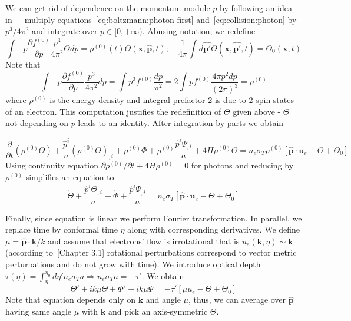 \documentclass[12pt]{extarticle}
\numberwithin{problem}{section}
\numberwithin{theorem}{section}
\begin{document}
	We can get rid of dependence on the momentum module $p$ by following an idea in~\cite{ma:1995} - multiply equations~\ref{eq:boltzmann:photon-first} and~\ref{eq:collision:photon} by $p^3/4\pi^2$ and integrate over $p\in[0,+\infty)$. Abusing notation, we redefine 
	\begin{equation}
		\label{eq:redef:theta}
		\int -p\frac{\partial f^{(0)}}{\partial p}\frac{p^3}{4\pi^2}\Theta dp = \rho^{(0)}(t)\Theta(\mathbf{x},\mathbf{\hat{p}}, t);\quad \frac{1}{4\pi}\int d\mathbf{\hat{p'}}\Theta(\mathbf{x}, \mathbf{\hat{p'}}, t) = \Theta_0(\mathbf{x}, t)
	\end{equation}
	Note that
	\begin{equation}
		\int -p\frac{\partial f^{(0)}}{\partial p}\frac{p^3}{4\pi^2} dp = \int p^3 f^{(0)} \frac{dp}{\pi^2} = 2\int pf^{(0)} \frac{4\pi p^2 dp}{(2\pi)^3} = \rho^{(0)}
	\end{equation}
	where $\rho^{(0)}$ is the energy density and integral prefactor 2 is due to 2 spin states of an electron. This computation justifies the redefinition of $\Theta$ given above - $\Theta$ not depending on $p$ leads to an identity. After integration by parts we obtain
	
	\begin{equation}
		\frac{\partial}{\partial t}(\rho^{(0)}\Theta) + \frac{\hat{p}^i}{a}(\rho^{(0)}\Theta)_{,i} + \rho^{(0)}\dot{\Phi} + \rho^{(0)}\frac{\hat{p}^i\Psi_{,i}}{a} + 4H\rho^{(0)}\Theta = n_e\sigma_T\rho^{(0)}[\mathbf{\hat{p}}\cdot\mathbf{u}_e - \Theta + \Theta_0]
	\end{equation}
	Using continuity equation $\partial \rho^{(0)}/\partial t + 4H\rho^{(0)} = 0$ for photons and reducing by $\rho^{(0)}$ simplifies an equation to
	\begin{equation}
		\dot{\Theta} + \frac{\hat{p}^i\Theta_{,i}}{a} + \dot{\Phi} + \frac{\hat{p}^i\Psi_{,i}}{a} = n_e\sigma_T[\mathbf{\hat{p}}\cdot\mathbf{u}_e - \Theta + \Theta_0]
	\end{equation}

	Finally, since equation is linear we perform Fourier transformation. In parallel, we replace time by conformal time $\eta$ along with corresponding derivatives. We define $\mu = \mathbf{\hat{p}}\cdot\mathbf{k} / k$ and assume that electrons' flow is irrotational that is $u_e(\mathbf{k}, \eta)\sim\mathbf{k}$ (according to~\cite{gorbunov-rubakov-2:2011}[Chapter 3.1] rotational perturbations correspond to vector metric perturbations and do not grow with time). We introduce optical depth $\tau(\eta) = \int^{\eta_0}_\eta d\eta' n_e\sigma_Ta \Rightarrow n_e\sigma_Ta = -\tau'$. We obtain
	\begin{equation}
		\label{eq:theta}
		\Theta' + ik\mu\Theta + \Phi' + ik\mu\Psi = -\tau'[\mu u_e - \Theta + \Theta_0]
	\end{equation}
	Note that equation depends only on $\mathbf{k}$ and angle $\mu$, thus, we can average over $\mathbf{\hat{p}}$ having same angle $\mu$ with $\mathbf{k}$ and pick an axis-symmetric $\Theta$.
	
\end{document}
